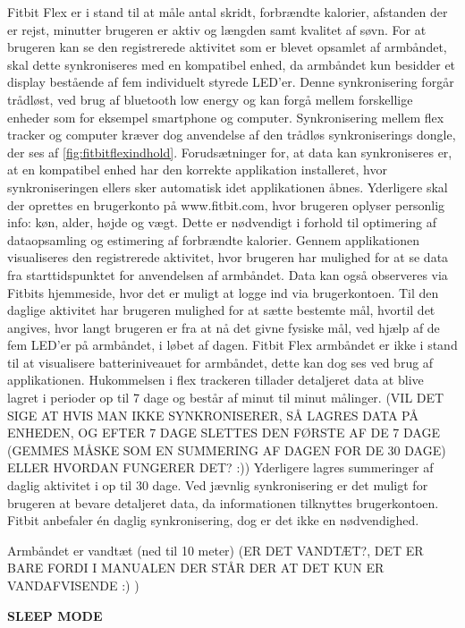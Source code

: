 Fitbit Flex er i stand til at måle antal skridt, forbrændte kalorier, afstanden der er rejst, minutter brugeren er aktiv og længden samt kvalitet af søvn. 
For at brugeren kan se den registrerede aktivitet som er blevet opsamlet af armbåndet, skal dette synkroniseres med en kompatibel enhed, da armbåndet kun besidder et display bestående af fem individuelt styrede LED'er.  
Denne synkronisering forgår trådløst, ved brug af bluetooth low energy og kan forgå mellem forskellige enheder som for eksempel smartphone og computer. 
Synkronisering mellem flex tracker og computer kræver dog anvendelse af den trådløs synkroniserings dongle, der ses af \autoref{fig:fitbitflexindhold}.
Forudsætninger for, at data kan synkroniseres er, at en kompatibel enhed har den korrekte applikation installeret, hvor synkroniseringen ellers sker automatisk idet applikationen åbnes.  
Yderligere skal der oprettes en brugerkonto på www.fitbit.com, hvor brugeren oplyser personlig info: køn, alder, højde og vægt. Dette er nødvendigt i forhold til optimering af dataopsamling og estimering af forbrændte kalorier.  
Gennem applikationen visualiseres den registrerede aktivitet, hvor brugeren har mulighed for at se data fra starttidspunktet for anvendelsen af armbåndet. Data kan også observeres via  Fitbits hjemmeside, hvor det er muligt at logge ind via brugerkontoen. 
Til den daglige aktivitet har brugeren mulighed for at sætte bestemte mål, hvortil det angives, hvor langt brugeren er fra at nå det givne fysiske mål, ved hjælp af de fem LED'er på armbåndet, i løbet af dagen.
Fitbit Flex armbåndet er ikke i stand til at visualisere batteriniveauet for armbåndet, dette kan dog ses ved brug af applikationen. 
Hukommelsen i flex trackeren tillader detaljeret data at blive lagret i perioder op til 7 dage og består af minut til minut målinger. (VIL DET SIGE AT HVIS MAN IKKE SYNKRONISERER, SÅ LAGRES DATA PÅ ENHEDEN, OG EFTER 7 DAGE SLETTES DEN FØRSTE AF DE 7 DAGE (GEMMES MÅSKE SOM EN SUMMERING AF DAGEN FOR DE 30 DAGE) ELLER HVORDAN FUNGERER DET? :)) 
Yderligere lagres summeringer af daglig aktivitet i op til 30 dage.
Ved jævnlig synkronisering er det muligt for brugeren at bevare detaljeret data, da informationen tilknyttes brugerkontoen. 
Fitbit anbefaler én daglig synkronisering, dog er det ikke en nødvendighed. 

Armbåndet er vandtæt (ned til 10 meter) (ER DET VANDTÆT?, DET ER BARE FORDI I MANUALEN DER STÅR DER AT DET KUN ER VANDAFVISENDE :) )

\textbf{SLEEP MODE}


